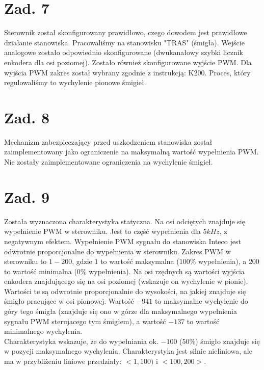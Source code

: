 \documentclass[a4paper,titlepage,11pt,twosides,floatssmall]{mwrep}
\begin{document}
\chapter{Zad. 7}

Sterownik został skonfigurowany prawidłowo, czego dowodem jest prawidłowe działanie stanowiska. Pracowaliśmy na stanowisku "TRAS" (śmigła). Wejście analogowe zostało odpowiednio skonfigurowane (dwukanałowy szybki licznik enkodera dla osi poziomej). Zostało również skonfigurowane wyjście PWM. Dla wyjścia PWM zakres został wybrany zgodnie z instrukcją: K200. Proces, który regulowaliśmy to wychylenie pionowe śmigieł.

\begingroup
\renewcommand{\cleardoublepage}{}
\renewcommand{\clearpage}{}

\chapter{Zad. 8}

Mechanizm zabezpieczający przed uszkodzeniem stanowiska został zaimplementowany jako ograniczenie na maksymalną wartość wypełnienia PWM. Nie zostały zaimplementowane ograniczenia na wychylenie śmigieł.


\chapter{Zad. 9}

Została wyznaczona charakterystyka statyczna. Na osi odciętych znajduje się wypełnienie PWM w sterowniku. Jest to część wypełnienia dla $5 kHz$, z negatywnym efektem. Wypełnienie PWM sygnału do stanowiska Inteco jest odwrotnie proporcjonalne do wypełnienia w sterowniku. Zakres PWM w sterowniku to $1 - 200$, gdzie $1$ to wartość maksymalna ($100\%$ wypełnienia), a $200$ to wartość minimalna ($0\%$ wypełnienia). Na osi rzędnych są wartości wyjścia enkodera znajdującego się na osi poziomej (wskazuje on wychylenie w pionie). Wartości te są odwrotnie proporcjonalnie do wysokości, na jakiej znajduje się śmigło pracujące w osi pionowej. Wartość $-941$ to maksymalne wychylenie do góry tego śmigła (znajduje się ono w górze dla maksymalnego wypełnienia sygnału PWM sterujacego tym śmigłem), a wartość $-137$ to wartość minimalnego wychylenia.\\
Charakterystyka wskazuje, że do wypełniania ok. $-100$ ($50\%$) śmigło znajduje się w pozycji maksymalnego wychylenia. Charakterystyka jest silnie nieliniowa, ale ma w przybliżeniu liniowe przedziały: $<1,100)$ i $<100,200>$.
\end{document}
